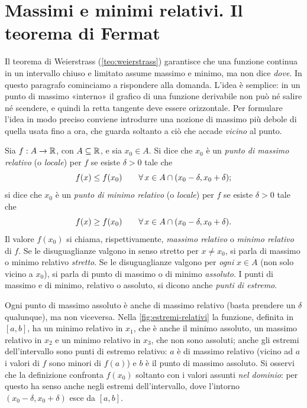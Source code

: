 \section{Massimi e minimi relativi. Il teorema di Fermat}
\label{sec:fermat}

Il teorema di Weierstrass (\cref{teo:weierstrass}) garantisce che una funzione continua
in un intervallo chiuso e limitato assume massimo e minimo, ma non dice \emph{dove}. In
questo paragrafo cominciamo a rispondere alla domanda. L'idea è semplice: in un punto
di massimo «interno» il grafico di una funzione derivabile non può né salire né
scendere, e quindi la retta tangente deve essere orizzontale. Per formulare l'idea in
modo preciso conviene introdurre una nozione di massimo più debole di quella usata fino
a ora, che guarda soltanto a ciò che accade \emph{vicino} al punto.

\begin{definizione}\label{def:max-min-relativo}
Sia $f:A\to\mathbb{R}$, con $A\subseteq\mathbb{R}$, e sia $x_{0}\in A$. Si dice che $x_{0}$ è un
\emph{punto di massimo relativo} (o \emph{locale}) per $f$ se esiste $\delta>0$ tale che
\begin{equation}\label{eq:max-relativo}
  f(x)\le f(x_{0}) \qquad\forall\, x\in A\cap(x_{0}-\delta,x_{0}+\delta);
\end{equation}
si dice che $x_{0}$ è un \emph{punto di minimo relativo} (o \emph{locale}) per $f$ se
esiste $\delta>0$ tale che
\begin{equation}\label{eq:min-relativo}
  f(x)\ge f(x_{0}) \qquad\forall\, x\in A\cap(x_{0}-\delta,x_{0}+\delta).
\end{equation}
Il valore $f(x_{0})$ si chiama, rispettivamente, \emph{massimo relativo} o \emph{minimo
relativo} di $f$. Se le disuguaglianze valgono in senso stretto per $x\neq x_{0}$, si
parla di massimo o minimo relativo \emph{stretto}. Se le disuguaglianze valgono per
\emph{ogni} $x\in A$ (non solo vicino a $x_{0}$), si parla di punto di massimo o di
minimo \emph{assoluto}. I punti di massimo e di minimo, relativo o assoluto, si dicono
anche \emph{punti di estremo}.
\end{definizione}

Ogni punto di massimo assoluto è anche di massimo relativo (basta prendere un $\delta$
qualunque), ma non viceversa. Nella \cref{fig:estremi-relativi} la funzione,
definita in $[a,b]$, ha un minimo relativo in $x_{1}$, che è anche il minimo assoluto,
un massimo relativo in $x_{2}$ e un minimo relativo in $x_{3}$, che non sono assoluti;
anche gli estremi dell'intervallo sono punti di estremo relativo: $a$ è di massimo
relativo (vicino ad $a$ i valori di $f$ sono minori di $f(a)$) e $b$ è il punto di
massimo assoluto. Si osservi che la definizione confronta $f(x_{0})$ soltanto con i
valori assunti \emph{nel dominio}: per questo ha senso anche negli estremi
dell'intervallo, dove l'intorno $(x_{0}-\delta,x_{0}+\delta)$ esce da $[a,b]$.

